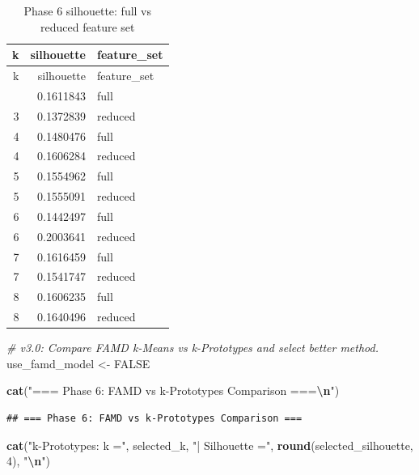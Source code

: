 \documentclass[
]{article}
\newenvironment{Shaded}{\begin{snugshade}}{\end{snugshade}}
\newcommand{\CommentTok}[1]{\textcolor[rgb]{0.56,0.35,0.01}{\textit{#1}}}
\newcommand{\ConstantTok}[1]{\textcolor[rgb]{0.56,0.35,0.01}{#1}}
\newcommand{\DecValTok}[1]{\textcolor[rgb]{0.00,0.00,0.81}{#1}}
\newcommand{\FunctionTok}[1]{\textcolor[rgb]{0.13,0.29,0.53}{\textbf{#1}}}
\newcommand{\NormalTok}[1]{#1}
\newcommand{\OtherTok}[1]{\textcolor[rgb]{0.56,0.35,0.01}{#1}}
\newcommand{\SpecialCharTok}[1]{\textcolor[rgb]{0.81,0.36,0.00}{\textbf{#1}}}
\newcommand{\StringTok}[1]{\textcolor[rgb]{0.31,0.60,0.02}{#1}}
\begin{document}
\begin{longtable}[]{@{}rrl@{}}
\caption{Phase 6 silhouette: full vs reduced feature set}\tabularnewline
\toprule\noalign{}
k & silhouette & feature\_set \\
\midrule\noalign{}
\endfirsthead
\toprule\noalign{}
k & silhouette & feature\_set \\
\midrule\noalign{}
\endhead
\bottomrule\noalign{}
\endlastfoot
3 & 0.1611843 & full \\
3 & 0.1372839 & reduced \\
4 & 0.1480476 & full \\
4 & 0.1606284 & reduced \\
5 & 0.1554962 & full \\
5 & 0.1555091 & reduced \\
6 & 0.1442497 & full \\
6 & 0.2003641 & reduced \\
7 & 0.1616459 & full \\
7 & 0.1541747 & reduced \\
8 & 0.1606235 & full \\
8 & 0.1640496 & reduced \\
\end{longtable}

\begin{Shaded}
\begin{Highlighting}[]
\CommentTok{\# v3.0: Compare FAMD k{-}Means vs k{-}Prototypes and select better method.}
\NormalTok{use\_famd\_model }\OtherTok{\textless{}{-}} \ConstantTok{FALSE}

\FunctionTok{cat}\NormalTok{(}\StringTok{"=== Phase 6: FAMD vs k{-}Prototypes Comparison ===}\SpecialCharTok{\textbackslash{}n}\StringTok{"}\NormalTok{)}
\end{Highlighting}
\end{Shaded}

\begin{verbatim}
## === Phase 6: FAMD vs k-Prototypes Comparison ===
\end{verbatim}

\begin{Shaded}
\begin{Highlighting}[]
\FunctionTok{cat}\NormalTok{(}\StringTok{"k{-}Prototypes: k ="}\NormalTok{, selected\_k,}
    \StringTok{"| Silhouette ="}\NormalTok{, }\FunctionTok{round}\NormalTok{(selected\_silhouette, }\DecValTok{4}\NormalTok{), }\StringTok{"}\SpecialCharTok{\textbackslash{}n}\StringTok{"}\NormalTok{)}
\end{Highlighting}
\end{Shaded}
\end{document}

